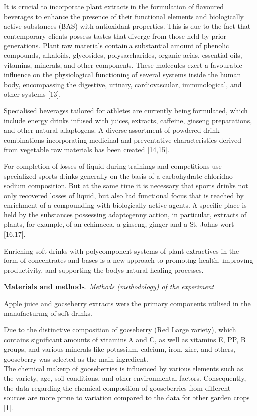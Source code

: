 It is crucial to incorporate plant extracts in the formulation of
flavoured beverages to enhance the presence of their functional elements
and biologically active substances (BAS) with antioxidant properties.
This is due to the fact that contemporary clients possess tastes that
diverge from those held by prior generations. Plant raw materials
contain a substantial amount of phenolic compounds, alkaloids,
glycosides, polysaccharides, organic acids, essential oils, vitamins,
minerals, and other components. These molecules exert a favourable
influence on the physiological functioning of several systems inside the
human body, encompassing the digestive, urinary, cardiovascular,
immunological, and other systems {[}13{]}.~

Specialised beverages tailored for athletes are currently being
formulated, which include energy drinks infused with juices, extracts,
caffeine, ginseng preparations, and other natural adaptogens. A diverse
assortment of powdered drink combinations incorporating medicinal and
preventative characteristics derived from vegetable raw materials has
been created {[}14,15{]}.

For completion of losses of liquid during trainings and competitions use
specialized sports drinks generally on the basis of a carbohydrate
chloridno - sodium composition. But at the same time it is necessary
that sports drinks not only recovered losses of liquid, but also had
functional focus that is reached by enrichment of a compounding with
biologically active agents. A specific place is held by the substances
possessing adaptogenny action, in particular, extracts of plants, for
example, of an echinacea, a ginseng, ginger and a St.
John\textquotesingle s wort {[}16,17{]}.

Enriching soft drinks with polycomponent systems of plant extractives in
the form of concentrates and bases is a new approach to promoting
health, improving productivity, and supporting the
body\textquotesingle s natural healing processes.

{\bfseries Materials and methods}\emph{. Methods (methodology) of the
experiment}

Apple juice and gooseberry extracts were the primary components utilised
in the manufacturing of soft drinks.~

Due to the distinctive composition of gooseberry (Red Large variety),
which contains significant amounts of vitamins A and C, as well as
vitamins E, PP, B groups, and various minerals like potassium, calcium,
iron, zinc, and others, gooseberry was selected as the main
ingredient.~\\
The chemical makeup of gooseberries is influenced by various elements
such as the variety, age, soil conditions, and other environmental
factors. Consequently, the data regarding the chemical composition of
gooseberries from different sources are more prone to variation compared
to the data for other garden crops {[}1{]}.~

